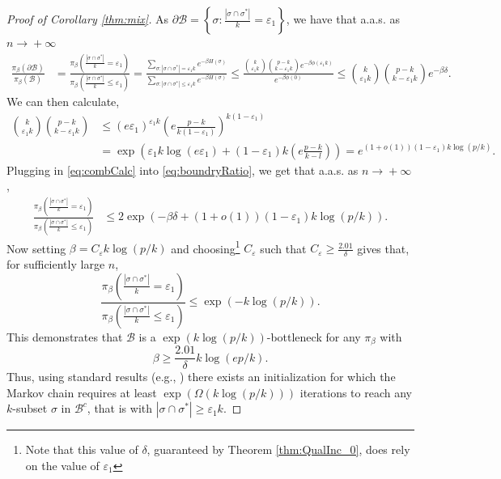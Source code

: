 \documentclass[12pt,reqno]{amsart}
\numberwithin{equation}{section}
\theoremstyle{definition}
\renewcommand{\epsilon}{\varepsilon}
\newcommand{\conv}[1]{\overset{#1}{\rightarrow}}
\renewcommand{\[}{\begin{equation}}
\renewcommand{\]}{\end{equation}}
\newcommand{\scr}{\mathcal}
\renewcommand{\|}{\bigg{|}}
\newcommand{\ngrow}{\ensuremath{n \conv{} +\infty} }
\begin{document}
\begin{proof}[Proof of Corollary \ref{thm:mix}]
As $\partial \scr{B} = \left\{\sigma: \frac{|\sigma \cap \sigma^*|}{k} = \epsilon_1\right\}$, we have that a.a.s. as \ngrow\!
\begin{align}
\frac{\pi_\beta(\partial \scr{B})}{\pi_\beta(\scr{B})}&= \frac{\pi_\beta\left(\frac{|\sigma \cap \sigma^*|}{k} =\epsilon_1\right)}{\pi_\beta\left( \frac{|\sigma \cap \sigma^*|}{k} \leq \epsilon_1\right)} = \frac{\sum_{\sigma: | \sigma \cap \sigma^* | =\epsilon_1 k}e^{-\beta H(\sigma)}}{\sum_{\sigma:  | \sigma \cap \sigma^* | \leq \epsilon_1 k}e^{-\beta H(\sigma)}} \leq \frac{\binom{k}{\epsilon_1 k}\binom{p-k}{k-\epsilon_1 k} e^{-\beta \phi(\epsilon_1 k)}}{e^{-\beta \phi(0)}} \leq \binom{k}{\epsilon_1 k}\binom{p-k}{k-\epsilon_1 k} 
 e^{-\beta \delta}.\label{eq:boundryRatio}
\end{align}
 We can then calculate, 
\begin{align}
    \binom{k}{\epsilon_1 k}\binom{p-k}{k-\epsilon_1 k} &\leq \left( e\epsilon_1\right)^{\epsilon_1 k}\left( e\frac{p-k}{k(1-\epsilon_1)}\right)^{k(1-\epsilon_1)} \\
    &= \exp\left(\epsilon_1 k\log\left( e\epsilon_1 \right) + (1-\epsilon_1)k\left( e\frac{p-k}{k-l}\right)\right)
    = e^{(1+o(1))(1-\epsilon_1)k\log(p/k)}.\label{eq:combCalc}
\end{align}
Plugging in \eqref{eq:combCalc} into \eqref{eq:boundryRatio}, we get that a.a.s. as \ngrow\!,
\begin{align}
    \frac{\pi_\beta\left(\frac{|\sigma \cap \sigma^*|}{k}=\epsilon_1\right)}{\pi_\beta\left( \frac{|\sigma \cap \sigma^*|}{k} \leq \epsilon_1\right)} & \leq 2\exp(-\beta \delta + (1+o(1))(1-\epsilon_1)k\log(p/k)).
\end{align}
Now setting $\beta = C_\epsilon k\log(p/k)$ and choosing\footnote{Note that this value of $\delta$, guaranteed by Theorem \ref{thm:QualInc_0}, does rely on the value of $\epsilon_1$} $C_{\epsilon}$ such that $C_\epsilon \geq \frac{2.01}{\delta}$ gives that, for sufficiently large $n$,
\[\frac{\pi_\beta\left(\frac{|\sigma \cap \sigma^*|}{k} =\epsilon_1\right)}{\pi_\beta\left( \frac{|\sigma \cap \sigma^*|}{k} \leq \epsilon_1\right)}\leq  \exp(-k\log(p/k)).\]
This demonstrates that $\scr{B}$ is a $\exp(k\log(p/k))$-bottleneck  for any $\pi_\beta$ with \[\beta \geq \frac{2.01}{ \delta}k \log(ep/k).\] Thus, using standard results (e.g., \cite[Proposition 2.2]{arous2023free}) there exists an initialization for which the Markov chain requires at least $\exp(\Omega(k \log(p/k)))$ iterations to reach any $k$-subset $\sigma$ in $\mathcal{B}^c$, that is with $| \sigma \cap \sigma^* | \geq \epsilon_1 k.$
\end{proof}
\end{document}
